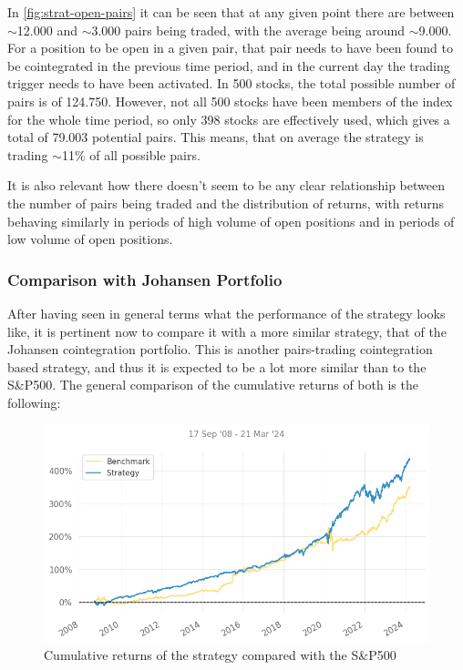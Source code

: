 In \autoref{fig:strat-open-pairs} it can be seen that at any given point there are between $\sim$12.000 and $\sim$3.000 pairs being traded, with the average being around $\sim$9.000. For a position to be open in a given pair, that pair needs to have been found to be cointegrated in the previous time period, and in the current day the trading trigger needs to have been activated. In 500 stocks, the total possible number of pairs is of 124.750. However, not all 500 stocks have been members of the index for the whole time period, so only 398 stocks are effectively used, which gives a total of 79.003 potential pairs. This means, that on average the strategy is trading $\sim$11\% of all possible pairs. 

It is also relevant how there doesn't seem to be any clear relationship between the number of pairs being traded and the distribution of returns, with returns behaving similarly in periods of high volume of open positions and in periods of low volume of open positions. 

\subsubsection{Comparison with Johansen Portfolio}
After having seen in general terms what the performance of the strategy looks like, it is pertinent now to compare it with a more similar strategy, that of the Johansen cointegration portfolio. This is another pairs-trading cointegration based strategy, and thus it is expected to be a lot more similar than to the S\&P500. The general comparison of the cumulative returns of both is the following:

\begin{figure}[ht]
    \includegraphics[width=\linewidth]{assets/strat-vs-johansen.png}
    \caption{Cumulative returns of the strategy compared with the S\&P500}
    \label{fig:strat-vs-johansen}
\end{figure}

